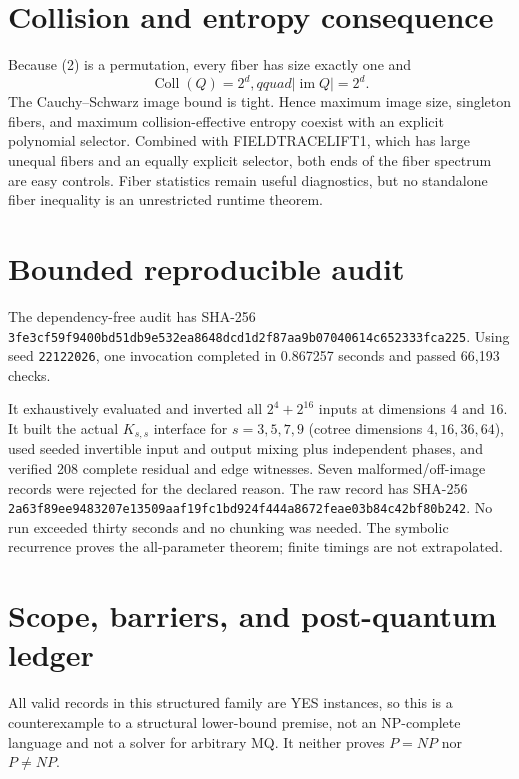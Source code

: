 \documentclass[11pt]{article}
\begin{document}
\section{Collision and entropy consequence}
Because (2) is a permutation, every fiber has size exactly one and
\[
 \operatorname{Coll}(Q)=2^d,qquad
 |\operatorname{im}Q|=2^d.                              \tag{5}
\]
The Cauchy--Schwarz image bound is tight.  Hence maximum image size, singleton
fibers, and maximum collision-effective entropy coexist with an explicit
polynomial selector.  Combined with FIELDTRACELIFT1, which has large unequal
fibers and an equally explicit selector, both ends of the fiber spectrum are
easy controls.  Fiber statistics remain useful diagnostics, but no standalone
fiber inequality is an unrestricted runtime theorem.

\section{Bounded reproducible audit}
The dependency-free audit
has SHA-256
\texttt{3fe3cf59f9400bd51db9e532ea8648dcd1d2f87aa9b07040614c652333fca225}.
Using seed \texttt{22122026}, one invocation completed in 0.867257 seconds
and passed 66,193 checks.

It exhaustively evaluated and inverted all $2^4+2^{16}$ inputs at dimensions
$4$ and $16$.  It built the actual $K_{s,s}$ interface for
$s=3,5,7,9$ (cotree dimensions $4,16,36,64$), used seeded invertible input and
output mixing plus independent phases, and verified 208 complete residual and
edge witnesses.  Seven malformed/off-image records were rejected for the
declared reason.  The raw record
has SHA-256
\texttt{2a63f89ee9483207e13509aaf19fc1bd924f444a8672feae03b84c42bf80b242}.
No run exceeded thirty seconds and no chunking was needed.  The symbolic
recurrence proves the all-parameter theorem; finite timings are not
extrapolated.

\section{Scope, barriers, and post-quantum ledger}
All valid records in this structured family are YES instances, so this is a
counterexample to a structural lower-bound premise, not an NP-complete
language and not a solver for arbitrary MQ.  It neither proves $P=NP$ nor
$P\ne NP$.
\end{document}
